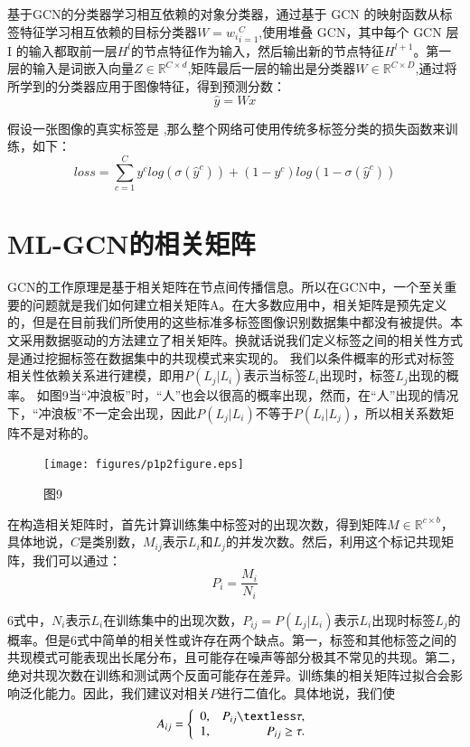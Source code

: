 基于GCN的分类器学习相互依赖的对象分类器，通过基于 GCN 的映射函数从标签特征学习相互依赖的目标分类器$W={w_i}_{i=1}^C$,使用堆叠 GCN，其中每个 GCN 层 I 的输入都取前一层$H^l$的节点特征作为输入，然后输出新的节点特征$H^{l+1}$。第一层的输入是词嵌入向量$Z\in \mathbb{R}^{C\times d}$,矩阵最后一层的输出是分类器$W\in \mathbb{R}^{C\times D}$,通过将所学到的分类器应用于图像特征，得到预测分数：
\begin{equation}
\label{dscNoStgProof0}
\hat{y} = Wx
\end{equation}

假设一张图像的真实标签是 ,那么整个网络可使用传统多标签分类的损失函数来训练，如下：
\begin{equation}
\label{dscNoStgProof0}
loss = \sum_{c=1}^C y^c log(\sigma(\hat{y}^c))+(1-y^c)log(1-\sigma(\hat{y}^c))
\end{equation}

\section{ML-GCN的相关矩阵}
GCN的工作原理是基于相关矩阵在节点间传播信息。所以在GCN中，一个至关重要的问题就是我们如何建立相关矩阵A。在大多数应用中，相关矩阵是预先定义的，但是在目前我们所使用的这些标准多标签图像识别数据集中都没有被提供。本文采用数据驱动的方法建立了相关矩阵。换就话说我们定义标签之间的相关性方式是通过挖掘标签在数据集中的共现模式来实现的。
我们以条件概率的形式对标签相关性依赖关系进行建模，即用$P(L_j|L_i)$表示当标签$L_i$出现时，标签$L_j$出现的概率。 如图9当“冲浪板”时，“人”也会以很高的概率出现，然而，在“人”出现的情况下，“冲浪板”不一定会出现，因此$P(L_j|L_i)$不等于$P(L_i|L_j)$，所以相关系数矩阵不是对称的。

\begin{figure}[htbp!]
	\centering
	\texttt{[image: figures/p1p2figure.eps]}
	\caption{图9}\label{fig:simuP1P2Result}
	\vspace{-1em}
\end{figure}


在构造相关矩阵时，首先计算训练集中标签对的出现次数，得到矩阵$M\in \mathbb{R}^{c\times b}$，具体地说，$C$是类别数，$M_{ij}$表示$L_i$和$L_j$的并发次数。然后，利用这个标记共现矩阵，我们可以通过：
\begin{equation}
\label{dscNoStgProof0}
P_i = \frac{M_i}{N_i}
\end{equation}

6式中，$N_i$表示$L_i$在训练集中的出现次数，$P_{ij}=P(L_j|L_i)$表示$L_i$出现时标签$L_j$的概率。但是6式中简单的相关性或许存在两个缺点。第一，标签和其他标签之间的共现模式可能表现出长尾分布，且可能存在噪声等部分极其不常见的共现。第二，绝对共现次数在训练和测试两个反面可能存在差异。训练集的相关矩阵过拟合会影响泛化能力。因此，我们建议对相关$P$进行二值化。具体地说，我们使
\begin{equation}
A_{ij} =\left\{
\begin{array}{lr}
0, & P_{ij}\textless \tau, \\
1, & P_{ij}\geq \tau. \\
\end{array}
\right. 
\label{con:Gamma_n}
\end{equation}

